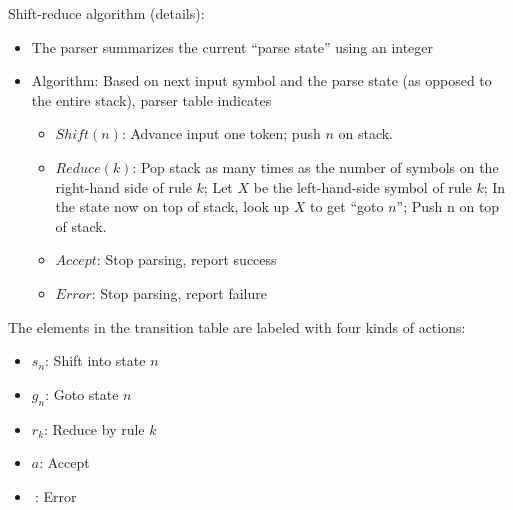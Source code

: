 Shift-reduce algorithm (details):
\begin{itemize}
    \item The parser summarizes the current ``parse state'' using an integer
    \item Algorithm: Based on next input symbol and the parse state (as opposed to the entire stack), parser table indicates
    \begin{itemize}
        \item $Shift(n)$: Advance input one token; push $n$ on stack.
        \item $Reduce(k)$:
        \subitem Pop stack as many times as the number of symbols on the right-hand side of rule $k$;
        \subitem Let $X$ be the left-hand-side symbol of rule $k$;
        \subitem In the state now on top of stack, look up $X$ to get ``goto $n$''; 
        \subitem Push n on top of stack.
        \item $Accept$: Stop parsing, report success
        \item $Error$: Stop parsing, report failure
    \end{itemize}
\end{itemize}

The elements in the transition table are labeled with four kinds of actions:
\begin{itemize}
    \item $s_n$: Shift into state $n$
    \item $g_n$: Goto state $n$
    \item $r_k$: Reduce by rule $k$
    \item $a$: Accept
    \item $\ $: Error 
\end{itemize}

